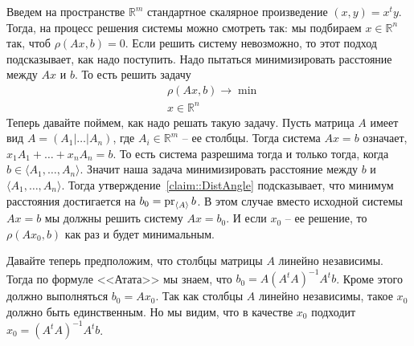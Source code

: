 Введем на пространстве $\mathbb R^m$ стандартное скалярное произведение $(x,y) = x^t y$. Тогда, на процесс решения системы можно смотреть так: мы подбираем $x\in \mathbb R^n$ так, чтоб $\rho(Ax, b) = 0$. Если решить систему невозможно, то этот подход подсказывает, как надо поступить. Надо пытаться минимизировать расстояние между $Ax$ и $b$. То есть решить задачу
\[
\begin{aligned}
&\rho(Ax, b)\to \min\\
&x\in \mathbb R^n
\end{aligned}
\]
Теперь давайте поймем, как надо решать такую задачу. Пусть матрица $A$ имеет вид $A = (A_1|\ldots|A_n)$, где $A_i\in \mathbb R^m$ -- ее столбцы. Тогда система $Ax = b$ означает, $x_1A_1 + \ldots + x_n A_n = b$. То есть система разрешима тогда и только тогда, когда $b\in \langle A_1,\ldots, A_n\rangle$. Значит наша задача минимизировать расстояние между $b$ и $\langle A_1,\ldots,A_n\rangle$. Тогда утверждение~\ref{claim::DistAngle} подсказывает, что минимум расстояния достигается на $b_0 = \operatorname{pr}_{\langle A\rangle}b$. В этом случае вместо исходной системы $Ax = b$ мы должны решить систему $Ax = b_0$. И если $x_0$ -- ее решение, то $\rho(Ax_0, b)$ как раз и будет минимальным.

Давайте теперь предположим, что столбцы матрицы $A$ линейно независимы. Тогда по формуле <<Атата>> мы знаем, что $b_0 = A(A^tA)^{-1}A^tb$. Кроме этого должно выполняться $b_0 = Ax_0$. Так как столбцы $A$ линейно независимы, такое $x_0$ должно быть единственным. Но мы видим, что в качестве $x_0$ подходит $x_0 = (A^tA)^{-1}A^tb$.


